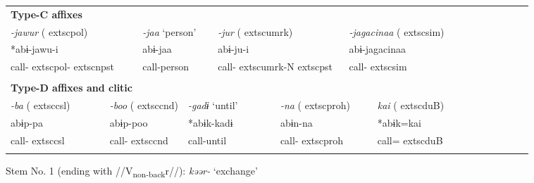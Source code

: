 \begin{tabularx}{\textwidth}{XXXXXXXXXXXXXXXXXXXXXX}
\multicolumn{22}{X}{{\bfseries Type-C affixes}}\\
\multicolumn{3}{X}{{ \textit{{}-jawur} (	extsc{pol})}} & \multicolumn{3}{X}{{ \textit{{}-jaa} ‘person’}} & \multicolumn{4}{X}{{ \textit{{}-jur} (	extsc{umrk})}} & \multicolumn{4}{X}{{ \textit{{}-jagacinaa} (	extsc{sim})}} & \multicolumn{8}{X}{}\\
\multicolumn{3}{X}{{ *abɨ-jawu-i}} & \multicolumn{3}{X}{{ abɨ-jaa}} & \multicolumn{4}{X}{abɨ-ju-i} & \multicolumn{4}{X}{{ abɨ-jagacinaa}} & \multicolumn{8}{X}{}\\
\multicolumn{3}{X}{call-	extsc{pol}-	extsc{npst}} & \multicolumn{3}{X}{call-person} & \multicolumn{4}{X}{call-	extsc{umrk}-N	extsc{pst}} & \multicolumn{4}{X}{call-	extsc{sim}} & \multicolumn{8}{X}{}\\
\multicolumn{22}{X}{}\\
\multicolumn{22}{X}{{\bfseries Type-D affixes and clitic}}\\
\multicolumn{2}{X}{{ \textit{{}-ba} (	extsc{csl})}} & \multicolumn{3}{X}{{ \textit{{}-boo} (	extsc{cnd})}} & \multicolumn{2}{X}{{ \textit{{}-gadɨ} ‘until’}} & \multicolumn{4}{X}{{ \textit{{}-na} (	extsc{proh})}} & \multicolumn{4}{X}{{ \textit{kai} (	extsc{du}B)}} & \multicolumn{7}{X}{}\\
\multicolumn{2}{X}{{ abɨp-pa}} & \multicolumn{3}{X}{{ abɨp-poo}} & \multicolumn{2}{X}{{ *abɨk-kadɨ}} & \multicolumn{4}{X}{{ abɨn-na}} & \multicolumn{4}{X}{{ *abɨk=kai}} & \multicolumn{7}{X}{}\\
\multicolumn{2}{X}{call-	extsc{csl}} & \multicolumn{3}{X}{call-	extsc{cnd}} & \multicolumn{2}{X}{call-until} & \multicolumn{4}{X}{call-	extsc{proh}} & \multicolumn{4}{X}{call=	extsc{du}B} & \multicolumn{7}{X}{}\\
\lspbottomrule
\end{tabularx}
Stem No. 1 (ending with //V\textsubscript{non-back}r//): \textit{kəər-} ‘exchange’

\tablefirsthead{}

